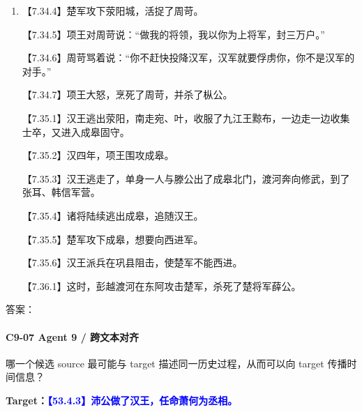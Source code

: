 \documentclass[fontset=none,11pt,a4paper]{ctexart}
\newcommand{\answerline}[1]{\underline{\hspace{#1}}}
\begin{document}
\begin{enumerate}[label=\Alph*.]
  \item
\noindent 【7.34.4】楚军攻下荥阳城，活捉了周苛。\par
\noindent 【7.34.5】项王对周苛说：“做我的将领，我以你为上将军，封三万户。”\par
\noindent 【7.34.6】周苛骂着说：“你不赶快投降汉军，汉军就要俘虏你，你不是汉军的对手。”\par
\noindent 【7.34.7】项王大怒，烹死了周苛，并杀了枞公。\par
\noindent 【7.35.1】汉王逃出荥阳，南走宛、叶，收服了九江王黥布，一边走一边收集士卒，又进入成皋固守。\par
\noindent 【7.35.2】汉四年，项王围攻成皋。\par
\noindent 【7.35.3】汉王逃走了，单身一人与滕公出了成皋北门，渡河奔向修武，到了张耳、韩信军营。\par
\noindent 【7.35.4】诸将陆续逃出成皋，追随汉王。\par
\noindent 【7.35.5】楚军攻下成皋，想要向西进军。\par
\noindent 【7.35.6】汉王派兵在巩县阻击，使楚军不能西进。\par
\noindent 【7.36.1】这时，彭越渡河在东阿攻击楚军，杀死了楚将军薛公。\par
\end{enumerate}
答案：\answerline{2.2cm}

\paragraph{C9-07 \quad Agent 9 / 跨文本对齐}
哪一个候选 source 最可能与 target 描述同一历史过程，从而可以向 target 传播时间信息？

\textbf{Target：}\textcolor{blue}{\textbf{【53.4.3】沛公做了汉王，任命萧何为丞相。}}
\end{document}
